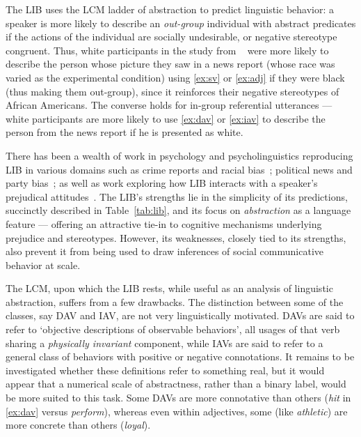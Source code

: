 The LIB uses the LCM ladder of abstraction to predict linguistic behavior: a speaker is more likely to describe an \emph{out-group} individual with abstract predicates if the actions of the individual are socially undesirable, or negative stereotype congruent. Thus, white participants in the study from ~\citet{gorham_news_2006} were more likely to describe the person whose picture they saw in a news report (whose race was varied as the experimental condition) using \ref{ex:sv} or \ref{ex:adj} if they were black (thus making them out-group), since it reinforces their negative stereotypes of African Americans. The converse holds for in-group referential utterances --- white participants are more likely to use \ref{ex:dav} or \ref{ex:iav} to describe the person from the news report if he is presented as white.

There has been a wealth of work in psychology and psycholinguistics reproducing LIB in various domains such as crime reports and racial bias~\citep{gorham_news_2006}; political news and party bias~\citep{Anolli2006LinguisticIB}; as well as work exploring how LIB interacts with a speaker's prejudical attitudes~\citep{schnake_modern_1998, greenwald_implicit_2006}. The LIB's strengths lie in the simplicity of its predictions, succinctly described in Table~\ref{tab:lib}, and its focus on \emph{abstraction} as a language feature --- offering an attractive tie-in to cognitive mechanisms underlying prejudice and stereotypes. However, its weaknesses, closely tied to its strengths, also prevent it from being used to draw inferences of social communicative behavior at scale.

The LCM, upon which the LIB rests, while useful as an analysis of linguistic abstraction, suffers from a few drawbacks. The distinction between some of the classes, say DAV and IAV, are not very linguistically motivated. DAVs are said to refer to `objective descriptions of observable behaviors', all usages of that verb sharing a \textit{physically invariant} component, while IAVs are said to refer to a general class of behaviors with positive or negative connotations. It remains to be investigated whether these definitions refer to something real, but it would appear that a numerical scale of abstractness, rather than a binary label, would be more suited to this task. Some DAVs are more connotative than others (\textit{hit} in \ref{ex:dav} versus \textit{perform}), whereas even within adjectives, some (like \textit{athletic}) are more concrete than others (\textit{loyal}).

